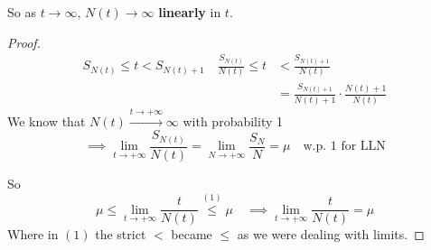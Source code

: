 So as $t \to\infty$, $N(t)\to\infty$ \textbf{linearly} in $t$.
\begin{proof}
	\begin{equation}
		\begin{split}
			S_{N(t)} \le t < S_{N(t)+1} \quad \frac{S_{N(t)}}{N(t)} \le t &< \frac{S_{N(t)+1}}{N(t)}\\
			&=\frac{S_{N(t)+1}}{N(t)+1} \cdot \frac{N(t)+1}{N(t)}
		\end{split}
	\end{equation}
	We know that $N(t)\xrightarrow{t\to +\infty} \infty$ with probability 1
	$$\implies \lim_{t \to +\infty} \frac{S_{N(t)}}{N(t)} =\lim_{N \to +\infty} \frac{S_{N}}{N} = \mu \quad \text{w.p. 1 for LLN}$$

	So
\begin{equation}
	\mu \le \lim_{t \to +\infty} \frac{t}{N(t)} \stackrel{(1)}{\le}\mu \quad \implies \lim_{t \to +\infty} \frac{t}{N(t)} = \mu
\end{equation}
Where in $(1)$ the strict $<$ became $\le$ as we were dealing with limits.
\end{proof}


